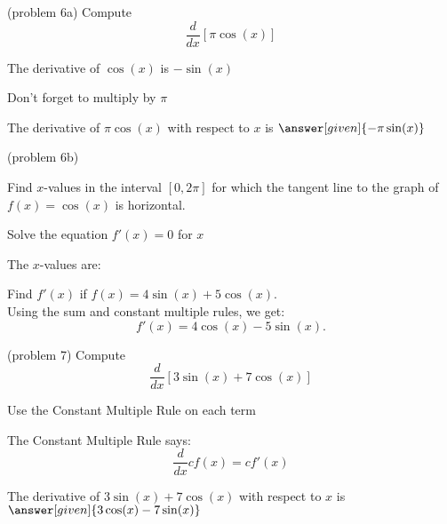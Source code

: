 \documentclass{ximera}
\begin{document}
\begin{problem}(problem 6a)
  Compute 
  \[
  \frac{d}{dx} \left[\pi\cos(x)\right]
  \]
  
    \begin{hint}
      The derivative of $\cos(x)$ is $-\sin(x)$
    \end{hint}
		\begin{hint}
		  Don't forget to multiply by $\pi$
		\end{hint}
		
		The derivative of $\pi\cos(x)$ with respect to $x$ is
		 $\answer[given]{-\pi\sin(x)}$
	
\end{problem}



\begin{problem}(problem 6b)

Find $x$-values in the interval $[0, 2\pi]$ for which the tangent line to the graph of $f(x) = \cos(x)$ is horizontal.


\begin{hint}
Solve the equation $f'(x) = 0$ for $x$
\end{hint}

The $x$-values are:
\begin{multipleChoice}
  \choice{$-\pi,0 \pi$}
\end{multipleChoice}

\end{problem}



\begin{foldable}
\end{foldable}


\begin{example}[example 7]
 Find $f'(x)$ if $f(x) = 4\sin(x) + 5\cos(x).$ \\
 Using the sum and constant multiple rules, we get: 
\[
f'(x) = 4\cos(x) - 5\sin(x).
\]
\end{example}


\begin{problem}(problem 7)
  Compute 
  \[
  \frac{d}{dx} \left[3\sin(x) + 7\cos(x)\right]
  \]
  
		\begin{hint}
      Use the Constant Multiple Rule on each term
    \end{hint}
    \begin{hint}
      The Constant Multiple Rule says:
      \[
      \frac{d}{dx} cf(x) = cf'(x)
      \]
    \end{hint}    
		The derivative of $3\sin(x) + 7\cos(x)$ with respect to $x$ is
		 $\answer[given]{3\cos(x) - 7\sin(x)}$
	
\end{problem}
\end{document}
